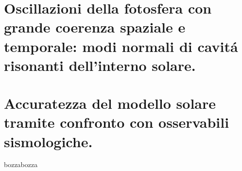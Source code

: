 \documentclass[twoside,11pt,fleqn]{memoir}%
\def\versione{bozza}%
\def\bozza{bozza}
\begin{document}
\cleartorecto
\part{Oscillazioni della fotosfera con grande coerenza spaziale e temporale: modi normali di cavit\'a risonanti dell'interno solare.}



\cleartorecto
\part{Accuratezza del modello solare tramite confronto con osservabili sismologiche.}



{\let\clearpage\relax\let\cleardoublepage\relax
\backmatter
}

%
{\let\clearpage\relax\let\cleardoublepage\relax
\printbibliography
}

\ifx\versione\bozza
\woc
\erratac
\fi
\end{document}
